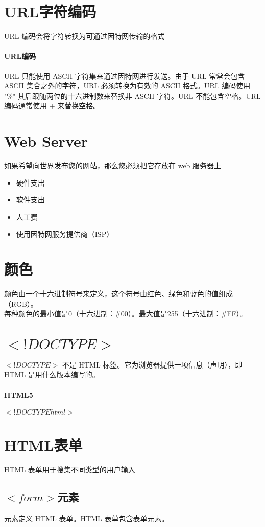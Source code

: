 \documentclass[10pt,UTF8]{ctexart}
\begin{document}
\section{URL字符编码}
URL 编码会将字符转换为可通过因特网传输的格式
\paragraph{URL编码}URL 只能使用 ASCII 字符集来通过因特网进行发送。由于 URL 常常会包含 ASCII 集合之外的字符，URL 必须转换为有效的 ASCII 格式。URL 编码使用 "\%" 其后跟随两位的十六进制数来替换非 ASCII 字符。URL 不能包含空格。URL 编码通常使用 + 来替换空格。

\section{Web Server}
如果希望向世界发布您的网站，那么您必须把它存放在 web 服务器上
\begin{itemize}
\item 硬件支出
\item 软件支出
\item 人工费
\item 使用因特网服务提供商（ISP）
\end{itemize}

\section{颜色}
颜色由一个十六进制符号来定义，这个符号由红色、绿色和蓝色的值组成（RGB）。\\
每种颜色的最小值是0（十六进制：\#00）。最大值是255（十六进制：\#FF）。

\section{$<!DOCTYPE>$}
$<!DOCTYPE>$ 不是 HTML 标签。它为浏览器提供一项信息（声明），即 HTML 是用什么版本编写的。
\paragraph{HTML5}$<!DOCTYPE html>$

\section{HTML表单}
HTML 表单用于搜集不同类型的用户输入
\subsection{$<form>$元素}
元素定义 HTML 表单。HTML 表单包含表单元素。
\end{document}
